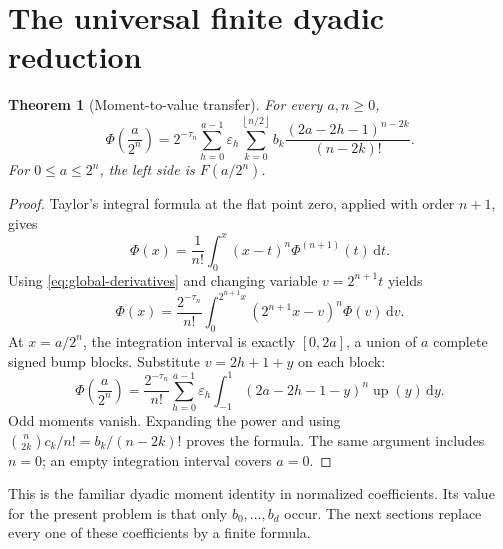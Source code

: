\documentclass[11pt,a4paper]{article}
\newtheorem{theorem}{Theorem}[section]
\theoremstyle{definition}
\theoremstyle{remark}
\newcommand{\Up}{\operatorname{up}}
\newcommand{\eps}{\varepsilon}
\newcommand{\dd}{\,\mathrm d}
\newcommand{\floor}[1]{\left\lfloor #1\right\rfloor}
\begin{document}
\section{The universal finite dyadic reduction}
\label{sec:master}
\begin{theorem}[Moment-to-value transfer]
\label{thm:master}
For every \(a,n\geq0\),
\begin{equation}
 \boxed{\displaystyle
 \Phi\!\left(\frac a{2^n}\right)=
 2^{-\tau_n}\sum_{h=0}^{a-1}\eps_h
 \sum_{k=0}^{\floor{n/2}}
 b_k\frac{(2a-2h-1)^{n-2k}}{(n-2k)!}.}                  \label{eq:master}
\end{equation}
For \(0\leq a\leq2^n\), the left side is \(F(a/2^n)\).
\end{theorem}
\begin{proof}
Taylor's integral formula at the flat point zero, applied with order \(n+1\), gives
\[
 \Phi(x)=\frac1{n!}\int_0^x(x-t)^n\Phi^{(n+1)}(t)\dd t.
\]
Using \eqref{eq:global-derivatives} and changing variable \(v=2^{n+1}t\) yields
\begin{equation}
 \Phi(x)=\frac{2^{-\tau_n}}{n!}
   \int_0^{2^{n+1}x}(2^{n+1}x-v)^n\Phi(v)\dd v.         \label{eq:primitive-master}
\end{equation}
At \(x=a/2^n\), the integration interval is exactly \([0,2a]\), a union of
\(a\) complete signed bump blocks.  Substitute \(v=2h+1+y\) on each block:
\[
 \Phi\!\left(\frac a{2^n}\right)=\frac{2^{-\tau_n}}{n!}
 \sum_{h=0}^{a-1}\eps_h
 \int_{-1}^{1}(2a-2h-1-y)^n\Up(y)\dd y.
\]
Odd moments vanish.  Expanding the power and using
\(\binom n{2k}c_k/n!=b_k/(n-2k)!\) proves the formula.
The same argument includes \(n=0\); an empty integration interval covers \(a=0\).
\end{proof}

This is the familiar dyadic moment identity in normalized coefficients.  Its value
for the present problem is that only \(b_0,\ldots,b_d\) occur.  The next sections
replace every one of these coefficients by a finite formula.
\end{document}
